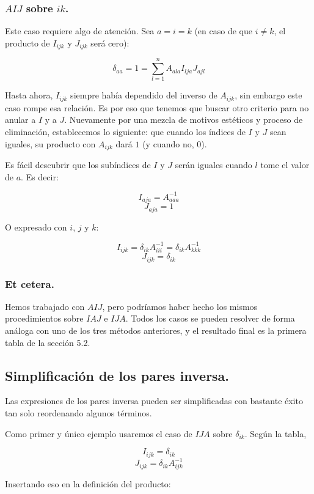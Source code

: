 \subsubsection{$AIJ$ sobre $ik$.}

Este caso requiere algo de atención. Sea $a = i = k$ (en caso de que $i \neq k$, el producto de $I_{ijk}$ y $J_{ijk}$ será cero):

$$\delta_{aa} = 1 = \sum\limits_{l = 1}^{n} A_{ala} I_{lja} J_{ajl}$$

Hasta ahora, $I_{ijk}$ siempre había dependido del inverso de $A_{ijk}$, sin embargo este caso rompe esa relación. Es por eso que tenemos que buscar otro criterio para no anular a $I$ y a $J$. Nuevamente por una mezcla de motivos estéticos y proceso de eliminación, establecemos lo siguiente: que cuando los índices de $I$ y $J$ sean iguales, su producto con $A_{ijk}$ dará $1$ (y cuando no, $0$).

Es fácil descubrir que los subíndices de $I$ y $J$ serán iguales cuando $l$ tome el valor de $a$. Es decir:

$$I_{aja} = A_{aaa}^{-1}$$
$$J_{aja} = 1$$

O expresado con $i$, $j$ y $k$:

$$I_{ijk} = \delta_{ik} A_{iii}^{-1} = \delta_{ik} A_{kkk}^{-1}$$
$$J_{ijk} = \delta_{ik}$$

\subsubsection{Et cetera.}

Hemos trabajado con $AIJ$, pero podríamos haber hecho los mismos procedimientos sobre $IAJ$ e $IJA$. Todos los casos se pueden resolver de forma análoga con uno de los tres métodos anteriores, y el resultado final es la primera tabla de la sección 5.2.

\subsection{Simplificación de los pares inversa.}

Las expresiones de los pares inversa pueden ser simplificadas con bastante éxito tan solo reordenando algunos términos.

Como primer y único ejemplo usaremos el caso de $IJA$ sobre $\delta_{ik}$. Según la tabla, 

$$I_{ijk} = \delta_{ik}$$
$$J_{ijk} = \delta_{ik} A_{ijk}^{-1}$$

Insertando eso en la definición del producto:

